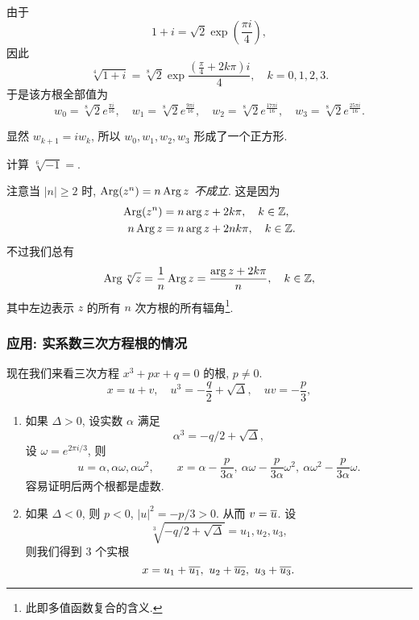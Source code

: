 \begin{solution}
  由于
    \[1+i=\sqrt2\exp\left(\dfrac{\pi i}4\right),\]
  因此
    \[\sqrt[4]{1+i}=\sqrt[8]2\exp\frac{(\frac\pi4+2k\pi)i}4,\quad k=0,1,2,3.\]
  于是该方根全部值为
    \[w_0=\sqrt[8]2e^{\frac{\pi i}{16}},\quad
    w_1=\sqrt[8]2e^{\frac{9\pi i}{16}},\quad
    w_2=\sqrt[8]2e^{\frac{17\pi i}{16}},\quad
    w_3=\sqrt[8]2e^{\frac{25\pi i}{16}}.\]
\end{solution}
显然 $w_{k+1}=iw_k$,
所以 $w_0,w_1,w_2,w_3$ 形成了一个正方形.
\begin{center}
\end{center}

\begin{exercise}
  计算 $\sqrt[6]{-1}=$\fillblank[5cm][2mm]{}.
\end{exercise}

注意当 $|n|\ge 2$ 时, \emph{$\operatorname{Arg}(z^n)=n\operatorname{Arg} z$ 不成立}.
这是因为
  \begin{align*}
    \operatorname{Arg}(z^n)&=n\arg z+2k\pi,\quad k\in{\mathbb{Z}},\\
    n\operatorname{Arg} z&=n\arg z+2nk\pi,\quad k\in{\mathbb{Z}}.
  \end{align*}
不过我们总有
  \[\operatorname{Arg} \sqrt[n]z=\dfrac1n\operatorname{Arg} z=\dfrac{\arg z+2k\pi}n,\quad k\in{\mathbb{Z}},\]
其中左边表示 $z$ 的所有 $n$ 次方根的所有辐角\footnote{此即多值函数复合的含义.}.


\subsubsection*{应用: 实系数三次方程根的情况}
现在我们来看三次方程 $x^3+px+q=0$ 的根, $p\neq 0$.
  \[x=u+v,\quad u^3=-\frac q2+\sqrt{\Delta},\quad uv=-\frac p3,\]
\begin{enumerate}
  \item 如果 $\Delta>0$, 设实数 $\alpha$ 满足
    \[\alpha^3=-q/2+\sqrt{\Delta},\]
    设 $\omega=e^{2\pi i/3}$, 则
    \[
      u=\alpha,\alpha\omega,\alpha\omega^2,\qquad
      x=\alpha-\frac p{3\alpha},\ 
        \alpha\omega-\frac p{3\alpha} \omega^2,\ 
        \alpha\omega^2-\frac p{3\alpha} \omega.
    \]
    容易证明后两个根都是虚数.
  \item 如果 $\Delta<0$, 则 $p<0$, $|u|^2=-p/3>0$. 从而 $v=\overline u$.
    设
      \[\sqrt[3]{-q/2+\sqrt{\Delta}}=u_1,u_2,u_3,\]
    则我们得到 $3$ 个实根
      \[x=u_1+\ov{u_1},\ u_2+\ov{u_2},\ u_3+\ov{u_3}.\]
\end{enumerate}


